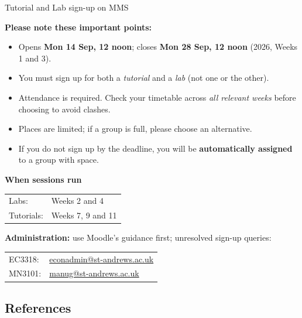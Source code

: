 \documentclass[9pt,aspectratio=169]{beamer}
\begin{document}
\begin{frame}{Tutorial and Lab sign-up on MMS}

\textbf{Please note these important points:}
\begin{itemize}
  \item Opens \textbf{Mon 14 Sep, 12 noon}; closes \textbf{Mon 28 Sep, 12 noon} (2026, Weeks 1 and 3).
  \item You must sign up for \alert{both a \emph{tutorial} and a \emph{lab}} (not one or the other).
  \item Attendance is required. Check your timetable across \emph{all relevant weeks} before choosing to avoid clashes.
  \item Places are limited; if a group is full, please choose an alternative.
  \item If you do not sign up by the deadline, you will be \textbf{automatically assigned} to a group with space.
\end{itemize}

\vspace{0.5em}
\textbf{When sessions run}

\begin{tabular}{@{}ll@{}}
Labs: & Weeks 2 and 4 \\
Tutorials: & Weeks 7, 9 and 11 \\
\end{tabular}

\vspace{0.6em}
\textbf{Administration:} use Moodle's guidance first; unresolved sign-up queries:

\begin{tabular}{@{}ll@{}}
EC3318: & \href{mailto:econadmin@st-andrews.ac.uk}{econadmin@st-andrews.ac.uk}  \\
MN3101: & \href{mailto:manug@st-andrews.ac.uk}{manug@st-andrews.ac.uk}  \\
\end{tabular}
\end{frame}

\subsection{References}
\end{document}
